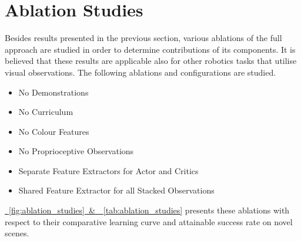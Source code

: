 \section{Ablation Studies}

Besides results presented in the previous section, various ablations of the full approach are studied in order to determine contributions of its components. It is believed that these results are applicable also for other robotics tasks that utilise visual observations. The following ablations and configurations are studied.
\vspace{-\topsep}
\begin{itemize}
    \itemsep -2.5mm
    \item No Demonstrations
    \item No Curriculum
    \item No Colour Features
    \item No Proprioceptive Observations
    \item Separate Feature Extractors for Actor and Critics
    \item Shared Feature Extractor for all Stacked Observations
\end{itemize}
\vspace{-\topsep}
\hyperref[fig:ablation_studies]{\figurename~\ref*{fig:ablation_studies}~\&~\tablename~\ref*{tab:ablation_studies}} presents these ablations with respect to their comparative learning curve and attainable success rate on novel scenes.

